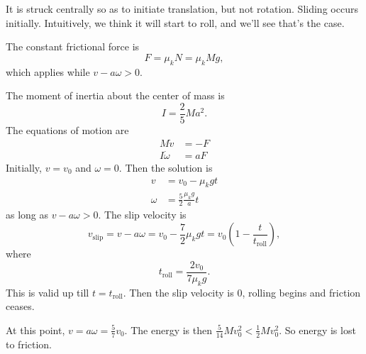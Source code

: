 \begin{example}\leavevmode
  \begin{center}
  \end{center}
  It is struck centrally so as to initiate translation, but not rotation. Sliding occurs initially. Intuitively, we think it will start to roll, and we'll see that's the case.

  The constant frictional force is
  \[
    F = \mu_k N = \mu_k Mg,
  \]
  which applies while $v - a\omega > 0$.

  The moment of inertia about the center of mass is
  \[
    I = \frac{2}{5}Ma^2.
  \]
  The equations of motion are
  \begin{align*}
    M\dot{v} &= -F\\
    I\dot\omega &= aF
  \end{align*}
  Initially, $v = v_0$ and $\omega = 0$. Then the solution is
  \begin{align*}
    v &= v_0 - \mu_k gt\\
    \omega &= \frac{5}{2} \frac{\mu_k g}{a}t
  \end{align*}
  as long as $v - a \omega > 0$. The slip velocity is
  \[
    v_{\mathrm{slip}} = v - a\omega = v_0 - \frac{7}{2}\mu_k gt = v_0 \left(1 - \frac{t}{t_\mathrm{roll}}\right),
  \]
  where
  \[
    t_{\mathrm{roll}} = \frac{2v_0}{7\mu_k g}.
  \]
  This is valid up till $t = t_{\mathrm{roll}}$. Then the slip velocity is 0, rolling begins and friction ceases.

  At this point, $v = a\omega = \frac{5}{7}v_0$. The energy is then $\frac{5}{14}Mv_0^2 < \frac{1}{2}Mv_0^2$. So energy is lost to friction.
\end{example}